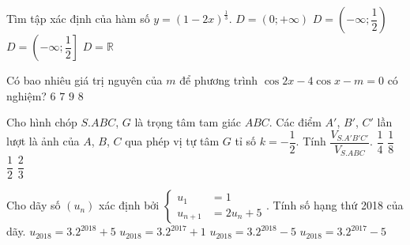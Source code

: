 \begin{ex}%
	Tìm tập xác định của hàm số $y=(1-2x)^{\frac{1}{3}}$.
	\choice
	{$D=(0;+\infty)$}
	{\True $D=\left(-\infty;\dfrac{1}{2}\right)$}
	{$D=\left(-\infty;\dfrac{1}{2}\right]$}
	{$D=\mathbb{R}$}
\end{ex}
\begin{ex}%
	Có bao nhiêu giá trị nguyên của $m$ để phương trình $\cos2x-4\cos x-m=0$ có nghiệm?
	\choice
	{$6$}
	{$7$}
	{\True $9$}
	{$8$}
\end{ex}
\begin{ex}%
	Cho hình chóp $S.ABC$, $G$ là trọng tâm tam giác $ABC$. Các điểm $A'$, $B'$, $C'$ lần lượt là ảnh của $A$, $B$, $C$ qua phép vị tự tâm $G$ tỉ số $k=-\dfrac{1}{2}$. Tính $\dfrac{V_{S.A'B'C'}}{V_{S.ABC}}$.
	\choice
	{\True $\dfrac{1}{4}$}
	{$\dfrac{1}{8}$}
	{$\dfrac{1}{2}$}
	{$\dfrac{2}{3}$}
\end{ex}
\begin{ex}%

Cho dãy số $(u_n)$ xác định bởi $\begin{cases}
u_1&=1 \\
u_{n+1}&=2u_n+5
\end{cases} $. Tính số hạng thứ 2018 của dãy.
\choice
{$u_{2018}=3.2^{2018}+5$}
{$u_{2018}=3.2^{2017}+1$}
{\True $u_{2018}=3.2^{2018}-5$}
{$u_{2018}=3.2^{2017}-5$}
\end{ex}
